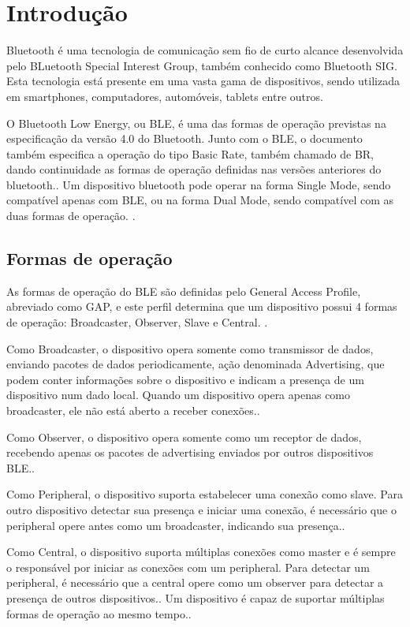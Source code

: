 \section{Introdução}

Bluetooth é uma tecnologia de comunicação sem fio de curto alcance desenvolvida
pelo BLuetooth Special Interest Group, também conhecido como Bluetooth SIG. Esta
tecnologia está presente em uma vasta gama de dispositivos, sendo utilizada em
smartphones, computadores, automóveis, tablets entre
outros\cite{gomez2012overview}.

O Bluetooth Low Energy, ou BLE, é uma das formas de operação previstas na
especificação da versão 4.0 do Bluetooth. Junto com o BLE, o documento também
especifica a operação do tipo Basic Rate, também chamado de BR, dando
continuidade as formas de operação definidas nas versões anteriores do
bluetooth.\cite{ble4core}.
Um dispositivo bluetooth pode operar na forma Single Mode, sendo compatível
apenas com BLE, ou na forma Dual Mode, sendo compatível com as duas
formas de operação. \cite{ble4core}.


\subsection{Formas de operação} %
As formas de operação do BLE são definidas pelo General Access Profile,
abreviado como GAP, e este perfil determina que um dispositivo possui 4 formas
de operação: Broadcaster, Observer, Slave e Central. \cite{ble4core}.

Como Broadcaster, o dispositivo opera somente como transmissor de dados,
enviando pacotes de dados periodicamente, ação denominada Advertising, que
podem conter informações sobre o dispositivo e indicam a presença de um 
dispositivo num dado local. Quando um dispositivo opera apenas como
broadcaster, ele não está aberto a receber conexões.\cite{ble4core}.

Como Observer, o dispositivo opera somente como um receptor de dados, recebendo
apenas os pacotes de advertising enviados por outros dispositivos
BLE.\cite{ble4core}.

Como Peripheral, o dispositivo suporta estabelecer uma conexão como slave. Para
outro dispositivo detectar sua presença e iniciar uma conexão, é necessário que
o peripheral opere antes como um broadcaster, indicando sua
presença.\cite{ble4core}.

Como Central, o dispositivo suporta múltiplas conexões como master e é sempre o
responsável por iniciar as conexões com um peripheral. Para detectar um
peripheral, é necessário que a central opere como um observer para detectar a
presença de outros dispositivos.\cite{ble4core}. Um dispositivo é capaz de
suportar múltiplas formas de operação ao mesmo tempo.\cite{ble4core}.

